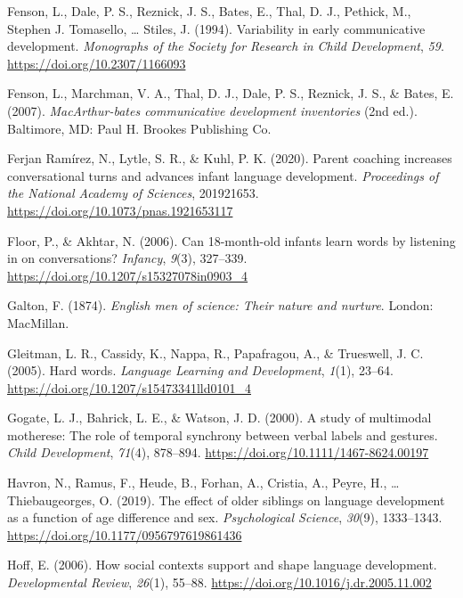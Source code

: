 \documentclass[
  english,
  man,floatsintext]{apa6}
\begin{document}
\leavevmode\hypertarget{ref-fenson_variability_1994}{}%
Fenson, L., Dale, P. S., Reznick, J. S., Bates, E., Thal, D. J., Pethick, M., Stephen J. Tomasello, \ldots{} Stiles, J. (1994). Variability in early communicative development. \emph{Monographs of the Society for Research in Child Development}, \emph{59}. \url{https://doi.org/10.2307/1166093}

\leavevmode\hypertarget{ref-fenson_macarthur-bates_2007}{}%
Fenson, L., Marchman, V. A., Thal, D. J., Dale, P. S., Reznick, J. S., \& Bates, E. (2007). \emph{MacArthur-bates communicative development inventories} (2nd ed.). Baltimore, MD: Paul H. Brookes Publishing Co.

\leavevmode\hypertarget{ref-ferjan_ramirez_parent_2020}{}%
Ferjan Ramírez, N., Lytle, S. R., \& Kuhl, P. K. (2020). Parent coaching increases conversational turns and advances infant language development. \emph{Proceedings of the National Academy of Sciences}, 201921653. \url{https://doi.org/10.1073/pnas.1921653117}

\leavevmode\hypertarget{ref-floor_can_2006}{}%
Floor, P., \& Akhtar, N. (2006). Can 18-month-old infants learn words by listening in on conversations? \emph{Infancy}, \emph{9}(3), 327--339. \url{https://doi.org/10.1207/s15327078in0903_4}

\leavevmode\hypertarget{ref-galton_english_1874}{}%
Galton, F. (1874). \emph{English men of science: Their nature and nurture}. London: MacMillan.

\leavevmode\hypertarget{ref-gleitman_hard_2005}{}%
Gleitman, L. R., Cassidy, K., Nappa, R., Papafragou, A., \& Trueswell, J. C. (2005). Hard words. \emph{Language Learning and Development}, \emph{1}(1), 23--64. \url{https://doi.org/10.1207/s15473341lld0101_4}

\leavevmode\hypertarget{ref-gogate_study_2000}{}%
Gogate, L. J., Bahrick, L. E., \& Watson, J. D. (2000). A study of multimodal motherese: The role of temporal synchrony between verbal labels and gestures. \emph{Child Development}, \emph{71}(4), 878--894. \url{https://doi.org/10.1111/1467-8624.00197}

\leavevmode\hypertarget{ref-havron_effect_2019}{}%
Havron, N., Ramus, F., Heude, B., Forhan, A., Cristia, A., Peyre, H., \ldots{} Thiebaugeorges, O. (2019). The effect of older siblings on language development as a function of age difference and sex. \emph{Psychological Science}, \emph{30}(9), 1333--1343. \url{https://doi.org/10.1177/0956797619861436}

\leavevmode\hypertarget{ref-hoff_how_2006}{}%
Hoff, E. (2006). How social contexts support and shape language development. \emph{Developmental Review}, \emph{26}(1), 55--88. \url{https://doi.org/10.1016/j.dr.2005.11.002}
\end{document}
